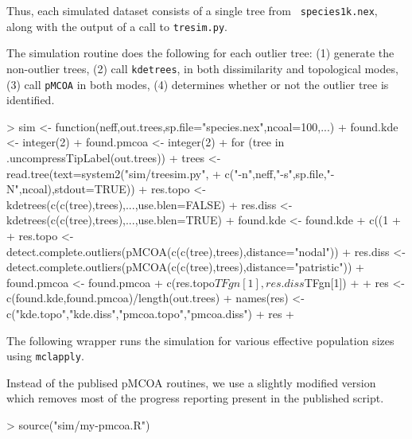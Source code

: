 \documentclass{article}
\begin{document}
Thus, each simulated dataset consists of a single tree from {\tt
  species1k.nex}, along with the output of a call to {\tt tresim.py}.

The simulation routine does the following for each outlier tree: (1)
generate the non-outlier trees, (2) call {\tt kdetrees}, in both
dissimilarity and topological modes, (3) call {\tt pMCOA} in both
modes, (4) determines whether or not the outlier tree is identified.
\begin{Schunk}
\begin{Sinput}
> sim <- function(neff,out.trees,sp.file="species.nex",ncoal=100,...){
+   found.kde <- integer(2)
+   found.pmcoa <- integer(2)
+   for (tree in .uncompressTipLabel(out.trees)){
+     trees <- read.tree(text=system2("sim/treesim.py",
+                          c("-n",neff,"-s",sp.file,"-N",ncoal),stdout=TRUE))
+     res.topo <- kdetrees(c(c(tree),trees),...,use.blen=FALSE)
+     res.diss <- kdetrees(c(c(tree),trees),...,use.blen=TRUE)
+     found.kde <- found.kde + c((1 %
+     
+     res.topo <- detect.complete.outliers(pMCOA(c(c(tree),trees),distance="nodal"))
+     res.diss <- detect.complete.outliers(pMCOA(c(c(tree),trees),distance="patristic"))
+     found.pmcoa <- found.pmcoa + c(res.topo$TFgn[1], res.diss$TFgn[1])
+   }
+   res <- c(found.kde,found.pmcoa)/length(out.trees) 
+   names(res) <- c("kde.topo","kde.diss","pmcoa.topo","pmcoa.diss")
+   res
+ }
\end{Sinput}
\end{Schunk}
The following wrapper runs the simulation for various effective
population sizes using {\tt mclapply}.
\begin{Schunk}
\end{Schunk}
Instead of the publised pMCOA routines, we use a slightly modified
version which removes most of the progress reporting present in the
published script.
\begin{Schunk}
\begin{Sinput}
> source("sim/my-pmcoa.R")
\end{Sinput}
\end{Schunk}
\end{document}
